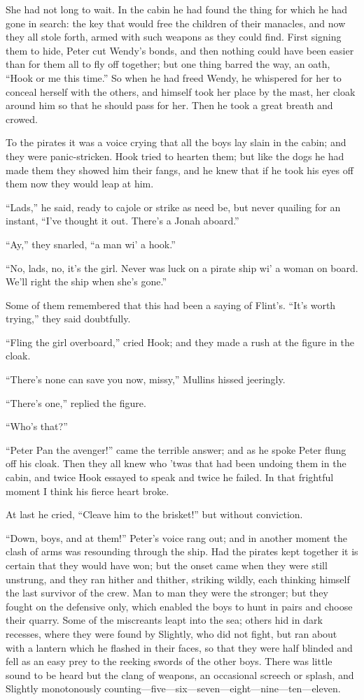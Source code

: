 She had not long to wait. In the cabin he had found the thing for which
he had gone in search: the key that would free the children of their
manacles, and now they all stole forth, armed with such weapons as they
could find. First signing them to hide, Peter cut Wendy's bonds, and
then nothing could have been easier than for them all to fly off
together; but one thing barred the way, an oath, ``Hook or me this
time.'' So when he had freed Wendy, he whispered for her to conceal
herself with the others, and himself took her place by the mast, her
cloak around him so that he should pass for her. Then he took a great
breath and crowed.

To the pirates it was a voice crying that all the boys lay slain in the
cabin; and they were panic-stricken. Hook tried to hearten them; but
like the dogs he had made them they showed him their fangs, and he knew
that if he took his eyes off them now they would leap at him.

``Lads,'' he said, ready to cajole or strike as need be, but never
quailing for an instant, ``I've thought it out. There's a Jonah aboard.''

``Ay,'' they snarled, ``a man wi' a hook.''

``No, lads, no, it's the girl. Never was luck on a pirate ship wi' a
woman on board. We'll right the ship when she's gone.''

Some of them remembered that this had been a saying of Flint's. ``It's
worth trying,'' they said doubtfully.

``Fling the girl overboard,'' cried Hook; and they made a rush at the
figure in the cloak.

``There's none can save you now, missy,'' Mullins hissed jeeringly.

``There's one,'' replied the figure.

``Who's that?''

``Peter Pan the avenger!'' came the terrible answer; and as he spoke
Peter flung off his cloak. Then they all knew who 'twas that had been
undoing them in the cabin, and twice Hook essayed to speak and twice he
failed. In that frightful moment I think his fierce heart broke.

At last he cried, ``Cleave him to the brisket!'' but without conviction.

``Down, boys, and at them!'' Peter's voice rang out; and in another
moment the clash of arms was resounding through the ship. Had the
pirates kept together it is certain that they would have won; but the
onset came when they were still unstrung, and they ran hither and
thither, striking wildly, each thinking himself the last survivor of
the crew. Man to man they were the stronger; but they fought on the
defensive only, which enabled the boys to hunt in pairs and choose
their quarry. Some of the miscreants leapt into the sea; others hid in
dark recesses, where they were found by Slightly, who did not fight,
but ran about with a lantern which he flashed in their faces, so that
they were half blinded and fell as an easy prey to the reeking swords
of the other boys. There was little sound to be heard but the clang of
weapons, an occasional screech or splash, and Slightly monotonously
counting—five—six—seven—eight—nine—ten—eleven.

